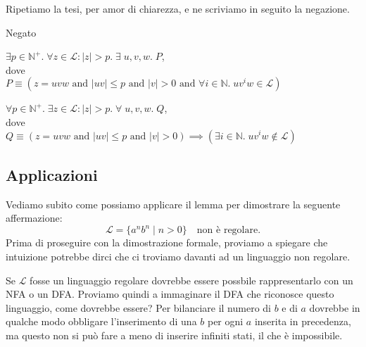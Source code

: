 \documentclass[class=book, crop=false, oneside, 12pt]{standalone}
\begin{document}
Ripetiamo la tesi, per amor di chiarezza, e ne scriviamo in seguito la negazione.
\begin{labeling}{Negato}
    \item[Tesi] 
    \(\exists p \in \mathbb{N}^+ . \;\forall z \in \mathcal{L}:|z|>p . \; \exists \;u, v, w . \; P\), \\ 
    dove \\
    \(P \equiv (z = uvw \textrm{ and } |uv| \le p \textrm{ and } |v| > 0 \textrm{ and } \forall i \in \mathbb{N} . \; uv^iw \in \mathcal{L}) \)
    \item[Negato]
    \(\forall p \in \mathbb{N}^+ . \;\exists z \in \mathcal{L}:|z|>p . \; \forall \;u, v, w . \; Q\), \\
    dove \\
    \(Q \equiv (z = uvw \textrm{ and } |uv| \le p \textrm{ and } |v| > 0) \implies (\exists i \in \mathbb{N} . \; uv^iw \notin \mathcal{L}) \) 
\end{labeling}

\subsection{Applicazioni}
Vediamo subito come possiamo applicare il lemma per dimostrare la seguente affermazione:
\begin{equation}
    \mathcal{L} = \{a^n b^n \mid n>0\} \quad \textrm{non è regolare.}
    \label{pl_regular_languages_ex_1}
\end{equation}
Prima di proseguire con la dimostrazione formale, proviamo a spiegare che intuizione potrebbe dirci che ci troviamo davanti ad un linguaggio non regolare.

Se \(\mathcal{L}\) fosse un linguaggio regolare dovrebbe essere possbile rappresentarlo con un NFA o un DFA. Proviamo quindi a immaginare il DFA che riconosce questo linguaggio, come dovrebbe essere? Per bilanciare il numero di \(b\) e di \(a\) dovrebbe in qualche modo obbligare l’inserimento di una \(b\) per ogni \(a\) inserita in precedenza, ma questo non si può fare a meno di inserire infiniti stati, il che è impossibile.
\end{document}
